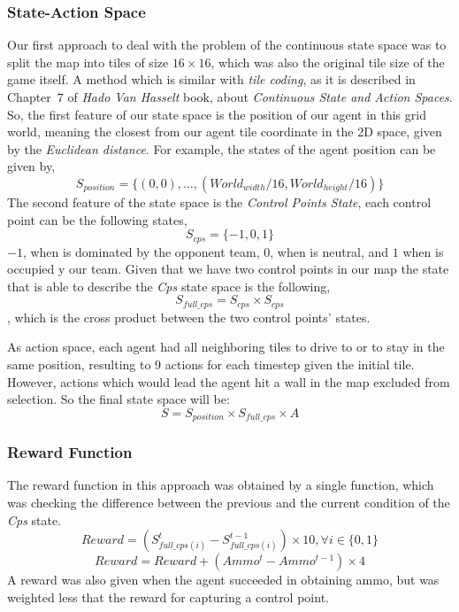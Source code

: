 \documentclass[conference]{IEEEtran}
\begin{document}
\subsubsection{State-Action Space}
Our first approach to deal with the problem of the continuous state space was to split the map into tiles of size $16\times16$, which was also the original tile size of the game itself. A method which is similar with \textit{tile coding}, as it is described in Chapter~$7$ of \emph{Hado Van Hasselt} book, about \textit{Continuous State and Action Spaces}. So, the first feature of our state space is the position of our agent in this grid world, meaning the closest from our agent tile coordinate in the 2D space, given by the \textit{Euclidean distance}. For example, the states of the agent position can be given by, 
\begin{equation}
S_{position} = \lbrace (0,0),\ldots,(World_{width} / 16, World_{height} / 16)  \rbrace
\end{equation} 
The second feature of the state space is the \textit{Control Points State}, each control point can be the following states,
\begin{equation}
S_{cps} = \lbrace -1, 0, 1 \rbrace
\end{equation}
$-1$, when is dominated by the opponent team, $0$, when is neutral, and $1$ when is occupied y our team. Given that we have two control points in our map the state that is able to describe the \textit{Cps} state space is the following, 
\begin{equation}
S_{full\_cps} = S_{cps} \times S_{cps} 
\end{equation}
, which is the cross product between the two control points' states. 

As action space, each agent had all neighboring tiles to drive to or to stay in the same position, resulting to 9 actions for each timestep given the initial tile. However, actions which would lead the agent hit a wall in the map excluded from selection. So the final state space will be:
\begin{equation}
S = S_{position} \times S_{full\_cps} \times A
\end{equation}
\subsubsection{Reward Function}
The reward function in this approach was obtained by a single function, which was checking the difference between the previous and the current condition of the \textit{Cps} state.
\begin{equation}
Reward = (S^{t}_{full\_cps(i)} - S^{t-1}_{full\_cps(i)}) \times 10, \forall i \in \lbrace 0,1 \rbrace
\end{equation}
\begin{equation}
Reward = Reward + (Ammo^{t} - Ammo^{t-1}) \times 4
\end{equation}
A reward was also given when the agent succeeded in obtaining ammo, but was weighted less that the reward for capturing a control point.
\end{document}
